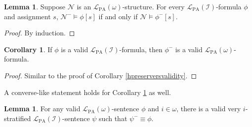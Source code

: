 \documentclass[reqno]{article}
\theoremstyle{definition}
\newtheorem{lemma}[theorem]{Lemma}
\newtheorem{corollary}[theorem]{Corollary}
\def\L{\mathscr{L}}
\def\LPA{\L_{\mathrm{PA}}}
\def\indset{\mathcal I}
\begin{document}
\begin{lemma}
\label{structuregrowingmagic}
Suppose $\mathscr N$ is an $\LPA(\omega)$-structure.
For every $\LPA(\indset)$-formula $\phi$ and assignment $s$,
$\mathscr N^-\models\phi[s]$ if and only if $\mathscr N\models\phi^-[s]$.
\end{lemma}



\begin{proof}
By induction.
\end{proof}

\begin{corollary}
\label{minuspreservesvalidity}
If $\phi$ is a valid $\LPA(\indset)$-formula, then $\phi^-$ is a valid $\LPA(\omega)$-formula.
\end{corollary}

\begin{proof}
Similar to the proof of Corollary \ref{hpreserversvalidity}.
\end{proof}

A converse-like statement holds for Corollary \ref{minuspreservesvalidity} as well.

\begin{lemma}
\label{validitylevator}
For any valid $\LPA(\omega)$-sentence $\phi$ and $i\in\omega$,
there is a valid very $i$-stratified $\LPA(\indset)$-sentence $\psi$
such that $\psi^-\equiv\phi$.
\end{lemma}
\end{document}
